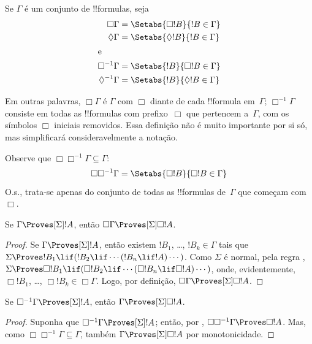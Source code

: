 \documentclass[../../../include/open-logic-section]{subfiles}
\begin{document}
\begin{defn}
  Se $\Gamma$ é um conjunto de !!{formula}s, seja
  \begin{align*}
    \Box\Gamma & = \Setabs{\Box !B}{!B \in \Gamma}\\
    \Diamond\Gamma & = \Setabs{\Diamond !B}{!B \in \Gamma}\\
    \intertext{e}
    \Box^{-1}\Gamma & = \Setabs{!B}{\Box !B \in \Gamma}\\
    \Diamond^{-1}\Gamma & = \Setabs{!B}{\Diamond !B \in \Gamma}\\
  \end{align*}
\end{defn}

Em outras palavras, $\Box\Gamma$ é $\Gamma$ com $\Box$ diante de cada
!!{formula} em~$\Gamma$; $\Box^{-1}\Gamma$ consiste em todas as
!!{formula}s com prefixo~$\Box$ que pertencem a~$\Gamma$, com os
símbolos $\Box$ iniciais removidos. Essa definição não é muito importante por si só,
mas simplificará consideravelmente a notação.

Observe que $\Box\Box^{-1}\Gamma \subseteq \Gamma$:
\[
\Box\Box^{-1}\Gamma = \Setabs{\Box!B}{\Box!B \in \Gamma}
\]
O.s.\@, trata-se apenas do conjunto de todas as !!{formula}s
de~$\Gamma$ que começam com~$\Box$.

\begin{lem}
  Se $\Gamma \Proves[\Sigma] !A$, então $\Box\Gamma \Proves[\Sigma] \Box
  !A$.
\end{lem}

\begin{proof}
  Se $\Gamma \Proves[\Sigma] !A$, então existem $!B_1$, \dots, $!B_k
  \in \Gamma$ tais que $\Sigma \Proves !B_1 \lif (!B_2 \lif \cdots
  (!B_n \lif !A)\cdots)$. Como $\Sigma$ é normal, pela regra \RK{},
  $\Sigma \Proves \Box!B_1 \lif (\Box!B_2 \lif \cdots (\Box!B_n \lif
  \Box!A)\cdots)$, onde, evidentemente, $\Box!B_1$, \dots,
  $\Box!B_k \in \Box\Gamma$. Logo, por definição,
  $\Box\Gamma \Proves[\Sigma] \Box
  !A$.
\end{proof}

\begin{lem}
  Se $\Box^{-1} \Gamma \Proves[\Sigma] !A$, então $\Gamma
  \Proves[\Sigma] \Box!A$.
\end{lem}

\begin{proof}
  Suponha que $\Box^{-1}\Gamma \Proves[\Sigma] !A$; então, por
  , $\Box\Box^{-1}\Gamma \Proves \Box!A$. Mas, como
  $\Box\Box^{-1}\Gamma \subseteq \Gamma$, também
  $\Gamma \Proves[\Sigma] \Box!A$ por monotonicidade.
\end{proof}
\end{document}
